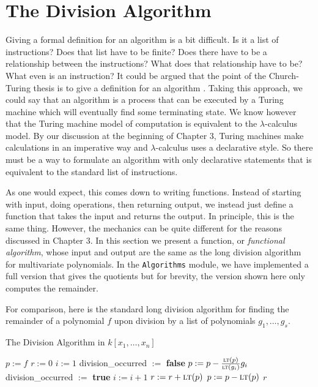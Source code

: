 \documentclass[MS, xcolor=dvipsnames]{wfuthesis}
\newcommand{\LT}{\ensuremath{\text{\sc lt}}}
\theoremstyle{definition}
\begin{document}
\section{The Division Algorithm}
Giving a formal definition for an algorithm is a bit difficult. Is it a list of instructions? Does that list have to be finite? Does there have to be a relationship between the instructions? What does that relationship have to be? What even is an instruction? It could be argued that the point of the Church-Turing thesis is to give a definition for an algorithm \cite{Kleene1952}. Taking this approach, we could say that an algorithm is a process that can be executed by a Turing machine which will eventually find some terminating state. We know however that the Turing machine model of computation is equivalent to the $\lambda$-calculus model. By our discussion at the beginning of Chapter 3, Turing machines make calculations in an imperative way and $\lambda$-calculus uses a declarative style. So there must be a way to formulate an algorithm with only declarative statements that is equivalent to the standard list of instructions. \par
As one would expect, this comes down to writing functions. Instead of starting with input, doing operations, then returning output, we instead just define a function that takes the input and returns the output. In principle, this is the same thing. However, the mechanics can be quite different for the reasons discussed in Chapter 3. In this section we present a function, or \emph{functional algorithm}, whose input and output are the same as the long division algorithm for multivariate polynomials. In the \lstinline{Algorithms} module, we have implemented a full version that gives the quotients but for brevity, the version shown here only computes the remainder. \par
For comparison, here is the standard long division algorithm for finding the remainder of a polynomial $f$ upon division by a list of polynomials $g_1,\dots,g_s$. \par
\begin{algorithm}
\caption{The Division Algorithm in $k[x_1,\dots,x_n]$}
\begin{algorithmic}
  \State $p:= f$
  \State $r:= 0$
    \State $i:= 1$
    \State division\_occurred $:=$ \textbf{false}
      \If{($\LT(g_i)$ divides $\LT(p)$)}
        \State $p := p - \frac{\LT(p)}{\LT(g_i)}g_i$
        \State division\_occurred $:=$ \textbf{true}
      \Else
        \State $i:= i+1$
      \EndIf
    \EndWhile
      \State $r := r + \LT(p)$
      \State $p := p - \LT(p)$
    \EndIf
  \EndWhile
  \State \Return $r$
\end{algorithmic}
\end{algorithm}
\end{document}
